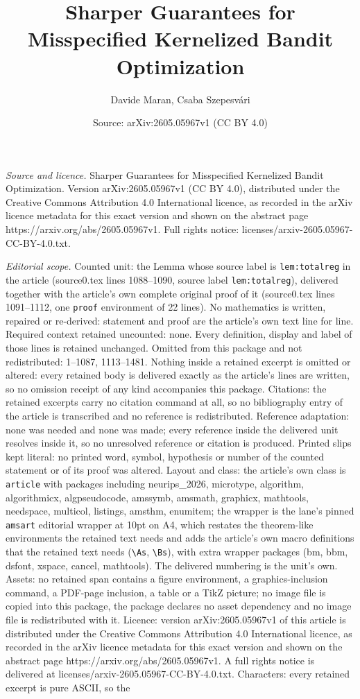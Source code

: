 \documentclass[10pt,a4paper]{amsart}
\title[Sharper Guarantees for Misspecified Kernelized Bandit Optimi]{Sharper Guarantees for Misspecified Kernelized Bandit Optimization}
\author{Davide Maran, Csaba Szepesv\'ari}
\date{Source: arXiv:2605.05967v1 (CC BY 4.0)}
\begin{document}
\maketitle

\noindent\emph{Source and licence.} Sharper Guarantees for Misspecified Kernelized Bandit Optimization. Version arXiv:2605.05967v1 (CC BY 4.0), distributed under the Creative Commons Attribution 4.0 International licence, as recorded in the arXiv licence metadata for this exact version and shown on the abstract page https://arxiv.org/abs/2605.05967v1. Full rights notice: licenses/arxiv-2605.05967-CC-BY-4.0.txt.\par\smallskip

\noindent\textit{Editorial scope.} Counted unit: the Lemma whose source label is \texttt{lem:totalreg} in the article (source0.tex lines 1088--1090, source label \texttt{lem:totalreg}), delivered together with the article's own complete original proof of it (source0.tex lines 1091--1112, one \texttt{proof} environment of 22 lines). No mathematics is written, repaired or re-derived: statement and proof are the article's own text line for line. Required context retained uncounted: none. Every definition, display and label of those lines is retained unchanged. Omitted from this package and not redistributed: 1--1087, 1113--1481. Nothing inside a retained excerpt is omitted or altered: every retained body is delivered exactly as the article's lines are written, so no omission receipt of any kind accompanies this package. Citations: the retained excerpts carry no citation command at all, so no bibliography entry of the article is transcribed and no reference is redistributed. Reference adaptation: none was needed and none was made; every reference inside the delivered unit resolves inside it, so no unresolved reference or citation is produced. Printed slips kept literal: no printed word, symbol, hypothesis or number of the counted statement or of its proof was altered. Layout and class: the article's own class is \texttt{article} with packages including neurips\_2026, microtype, algorithm, algorithmicx, algpseudocode, amssymb, amsmath, graphicx, mathtools, needspace, multicol, listings, amsthm, enumitem; the wrapper is the lane's pinned \texttt{amsart} editorial wrapper at 10pt on A4, which restates the theorem-like environments the retained text needs and adds the article's own macro definitions that the retained text needs (\texttt{\textbackslash As}, \texttt{\textbackslash Bs}), with extra wrapper packages (bm, bbm, dsfont, xspace, cancel, mathtools). The delivered numbering is the unit's own. Assets: no retained span contains a figure environment, a graphics-inclusion command, a PDF-page inclusion, a table or a TikZ picture; no image file is copied into this package, the package declares no asset dependency and no image file is redistributed with it. Licence: version arXiv:2605.05967v1 of this article is distributed under the Creative Commons Attribution 4.0 International licence, as recorded in the arXiv licence metadata for this exact version and shown on the abstract page https://arxiv.org/abs/2605.05967v1. A full rights notice is delivered at licenses/arxiv-2605.05967-CC-BY-4.0.txt. Characters: every retained excerpt is pure ASCII, so the 
\end{document}
